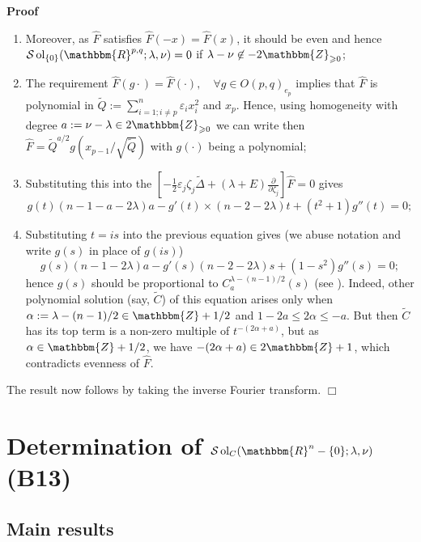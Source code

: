 \documentclass[12pt]{article}
\newcommand{\assign}{:=}
\newcommand{\nin}{\not\in}
\newcommand{\tmop}[1]{\ensuremath{\operatorname{#1}}}
\renewenvironment{proof}{\noindent\textbf{Proof\ }}{\hspace*{\fill}$\Box$\medskip}
\theoremstyle{remark}
\begin{document}
\begin{proof}
\begin{enumerate}
    \item Moreover, as $\hat{F}$ satisfies $\hat{F} (- x) = \hat{F} (x)$, it
    should be even and hence $\mathcal{S} \tmop{ol}_{\{ 0 \}} (\mathbbm{R}^{p,
    q} ; \lambda, \nu) = 0$ if $\lambda - \nu \nin - 2\mathbbm{Z}_{\geqslant
    0}$;
    
    \item The requirement $\hat{F} (g \cdot) = \hat{F} (\cdot), \quad \forall
    g \in O (p, q)_{e_p}$ implies that $\hat{F}$ is polynomial in $\tilde{Q}
    \assign \sum_{i = 1 ; i \neq p}^n \varepsilon_i x_i^2$ and $x_p$. Hence,
    using homogeneity with degree $a \assign \nu - \lambda \in
    2\mathbbm{Z}_{\geqslant 0}$ we can write then $\hat{F} = \tilde{Q}^{a / 2}
    g \left( x_{p - 1} / \sqrt{\tilde{Q}} \right)$ with $g (\cdot)$ being a
    polynomial;
    
    \item Substituting this into the $\left[ - \frac{1}{2} \varepsilon_j
    \zeta_j \tilde{\Delta} + (\lambda + E) \frac{\partial}{\partial \zeta_j}
    \right] \hat{F} = 0$ gives
    \[ g (t) (n - 1 - a - 2 \lambda) a - g' (t) \times (n - 2 - 2 \lambda) t
       + (t^2 + 1) g'' (t) = 0 ; \]
    \item Substituting $t = i s$ into the previous equation gives (we abuse
    notation and write $g (s)$ in place of $g (i s)$)
    \[ g (s) (n - 1 - 2 \lambda) a - g' (s) (n - 2 - 2 \lambda) s + (1 - s^2)
       g'' (s) = 0 ; \]
    hence $g (s)$ should be proportional to $C^{\lambda - (n - 1) / 2}_a (s)$
    (see {\cite[thm. 11.4]{kobayashi2015differential2}}). Indeed, other
    polynomial solution (say, $\tilde{C}$) of this equation arises only when
    $\alpha \assign \lambda - (n - 1) / 2 \in \mathbbm{Z}+ 1 / 2$ and $1 - 2 a
    \leqslant 2 \alpha \leqslant - a$. But then $\tilde{C}$ has its top term
    is a non-zero multiple of $t^{- (2 \alpha + a)}$, but as $\alpha \in
    \mathbbm{Z}+ 1 / 2$, we have $- (2 \alpha + a) \in 2\mathbbm{Z}+ 1$, which
    contradicts evenness of $\hat{F}$.
  \end{enumerate}
  The result now follows by taking the inverse Fourier transform.
\end{proof}

\section{Determination of $\mathcal{S} \tmop{ol}_C (\mathbbm{R}^n - \{ 0 \} ;\lambda, \nu)$ (B13)}\label{sec:uniq-c}


\subsection{Main results}
\end{document}
